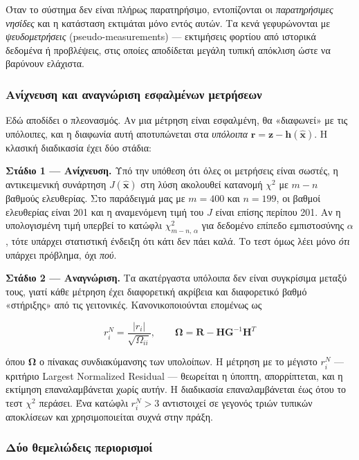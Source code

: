 Όταν το σύστημα δεν είναι πλήρως παρατηρήσιμο, εντοπίζονται οι \emph{παρατηρήσιμες νησίδες}
και η κατάσταση εκτιμάται μόνο εντός αυτών. Τα κενά γεφυρώνονται με \emph{ψευδομετρήσεις}
(pseudo-measurements) — εκτιμήσεις φορτίου από ιστορικά δεδομένα ή προβλέψεις, στις οποίες
αποδίδεται μεγάλη τυπική απόκλιση ώστε να βαρύνουν ελάχιστα.

\subsubsection*{Ανίχνευση και αναγνώριση εσφαλμένων μετρήσεων}

Εδώ αποδίδει ο πλεονασμός. Αν μια μέτρηση είναι εσφαλμένη, θα «διαφωνεί» με τις υπόλοιπες,
και η διαφωνία αυτή αποτυπώνεται στα \emph{υπόλοιπα}
$\mathbf{r} = \mathbf{z}-\mathbf{h}(\hat{\mathbf{x}})$. Η κλασική διαδικασία έχει δύο στάδια:

\textbf{Στάδιο 1 — Ανίχνευση.} Υπό την υπόθεση ότι όλες οι μετρήσεις είναι σωστές, η
αντικειμενική συνάρτηση $J(\hat{\mathbf{x}})$ στη λύση ακολουθεί κατανομή $\chi^2$ με
$m-n$ βαθμούς ελευθερίας. Στο παράδειγμά μας με $m = 400$ και $n = 199$, οι βαθμοί
ελευθερίας είναι 201 και η αναμενόμενη τιμή του $J$ είναι επίσης περίπου 201. Αν η
υπολογισμένη τιμή υπερβεί το κατώφλι $\chi^2_{m-n,\,\alpha}$ για δεδομένο επίπεδο
εμπιστοσύνης $\alpha$, τότε υπάρχει στατιστική ένδειξη ότι κάτι δεν πάει καλά. Το τεστ
όμως λέει μόνο \emph{ότι} υπάρχει πρόβλημα, όχι \emph{πού}.

\textbf{Στάδιο 2 — Αναγνώριση.} Τα ακατέργαστα υπόλοιπα δεν είναι συγκρίσιμα μεταξύ τους,
γιατί κάθε μέτρηση έχει διαφορετική ακρίβεια και διαφορετικό βαθμό «στήριξης» από τις
γειτονικές. Κανονικοποιούνται επομένως ως

\begin{equation}
r_i^{N} = \frac{|r_i|}{\sqrt{\Omega_{ii}}}, \qquad
\boldsymbol{\Omega} = \mathbf{R} - \mathbf{H}\mathbf{G}^{-1}\mathbf{H}^{T}
\label{eq:normres}
\end{equation}

όπου $\boldsymbol{\Omega}$ ο πίνακας συνδιακύμανσης των υπολοίπων. Η μέτρηση με το μέγιστο
$r_i^{N}$ — κριτήριο Largest Normalized Residual — θεωρείται η ύποπτη, απορρίπτεται, και η
εκτίμηση επαναλαμβάνεται χωρίς αυτήν. Η διαδικασία επαναλαμβάνεται έως ότου το τεστ $\chi^2$
περάσει. Ένα κατώφλι $r_i^{N} > 3$ αντιστοιχεί σε γεγονός τριών τυπικών αποκλίσεων και
χρησιμοποιείται συχνά στην πράξη.

\subsubsection*{Δύο θεμελιώδεις περιορισμοί}


